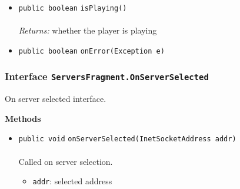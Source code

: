 \begin{itemize}
\item \lstinline|public boolean| \lstinline|isPlaying|\lstinline|()|\\ \\[-0.6em]
\emph{Returns:} whether the player is playing



\item \lstinline|public boolean| \lstinline|onError|\lstinline|(Exception e)| \\[-0.6em]




\end{itemize}

\subsubsection{Interface \lstinline|ServersFragment.OnServerSelected|}
On server selected interface. \\
\noindent\begin{minipage}[t]{5cm}
\vspace{0.3em}
\hspace*{2em}
\vspace{0.3em}
\end{minipage}





\textbf{\sffamily Methods}
\begin{itemize}
\item \lstinline|public void| \lstinline|onServerSelected|\lstinline|(InetSocketAddress addr)|\\ \\[-0.6em]
Called on server selection.
\begin{itemize}
\item \lstinline|addr|: selected address
\end{itemize}



\end{itemize}

